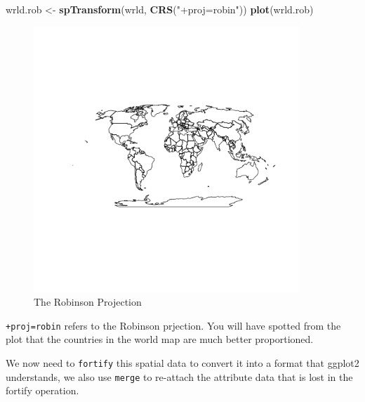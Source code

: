\documentclass[]{article}
\newenvironment{Shaded}{}{}
\newcommand{\KeywordTok}[1]{\textcolor[rgb]{0.00,0.44,0.13}{\textbf{{#1}}}}
\newcommand{\StringTok}[1]{\textcolor[rgb]{0.25,0.44,0.63}{{#1}}}
\newcommand{\NormalTok}[1]{{#1}}
\let\Oldincludegraphics\includegraphics
\renewcommand{\includegraphics}[1]{\Oldincludegraphics[width=10cm]{#1}}
\begin{document}
\begin{Shaded}
\begin{Highlighting}[]
\NormalTok{wrld.rob <- }\KeywordTok{spTransform}\NormalTok{(wrld, }\KeywordTok{CRS}\NormalTok{(}\StringTok{"+proj=robin"}\NormalTok{))}
\KeywordTok{plot}\NormalTok{(wrld.rob)}
\end{Highlighting}
\end{Shaded}
\begin{figure}[htbp]
\centering
\includegraphics{figure/The_Robinson_Projection.png}
\caption{The Robinson Projection}
\end{figure}

\texttt{+proj=robin} refers to the Robinson prjection. You will have
spotted from the plot that the countries in the world map are much
better proportioned.

We now need to \texttt{fortify} this spatial data to convert it into a
format that ggplot2 understands, we also use \texttt{merge} to re-attach
the attribute data that is lost in the fortify operation.
\end{document}
